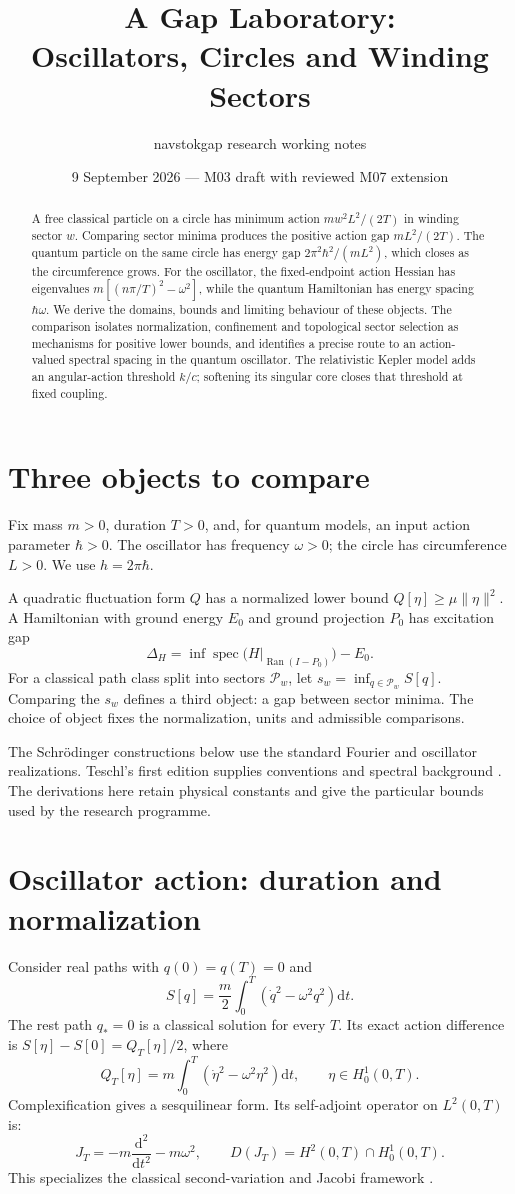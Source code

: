 \documentclass[11pt,a4paper]{article}
\title{A Gap Laboratory:\\Oscillators, Circles and Winding Sectors}
\author{navstokgap research working notes}
\date{9 September 2026 --- M03 draft with reviewed M07 extension}
\newcommand{\dd}{\mathrm{d}}
\newcommand{\spec}{\operatorname{spec}}
\begin{document}
\maketitle
\begin{abstract}
A free classical particle on a circle has minimum action $mw^2L^2/(2T)$
in winding sector $w$. Comparing sector minima produces the positive action
gap $mL^2/(2T)$. The quantum particle on the same circle has energy gap
$2\pi^2\hbar^2/(mL^2)$, which closes as the circumference grows.
For the oscillator, the fixed-endpoint action Hessian has eigenvalues
$m[(n\pi/T)^2-\omega^2]$, while the quantum Hamiltonian has energy spacing
$\hbar\omega$. We derive the domains, bounds and limiting behaviour of these
objects. The comparison isolates normalization, confinement and topological
sector selection as mechanisms for positive lower bounds, and identifies a
precise route to an action-valued spectral spacing in the quantum oscillator.
The relativistic Kepler model adds an angular-action threshold $k/c$;
softening its singular core closes that threshold at fixed coupling.
\end{abstract}

\section{Three objects to compare}
Fix mass $m>0$, duration $T>0$, and, for quantum models, an input action
parameter $\hbar>0$. The oscillator has frequency $\omega>0$; the circle has
circumference $L>0$. We use $h=2\pi\hbar$.

A quadratic fluctuation form $Q$ has a normalized lower bound
$Q[\eta]\ge\mu\|\eta\|^2$. A Hamiltonian with ground energy $E_0$ and ground
projection $P_0$ has excitation gap
\[
 \Delta_H=\inf\spec\bigl(H|_{\operatorname{Ran}(I-P_0)}\bigr)-E_0.
\]
For a classical path class split into sectors $\mathcal P_w$, let
$s_w=\inf_{q\in\mathcal P_w}S[q]$. Comparing the $s_w$ defines a third object:
a gap between sector minima. The choice of object fixes the normalization,
units and admissible comparisons.

The Schr\"odinger constructions below use the standard Fourier and oscillator
realizations. Teschl's first edition supplies conventions and spectral background
\cite[\S7.2, \S8.3]{Teschl2009}. The derivations here retain physical constants
and give the particular bounds used by the research programme.

\section{Oscillator action: duration and normalization}
Consider real paths with $q(0)=q(T)=0$ and
\[
 S[q]=\frac m2\int_0^T(\dot q^2-\omega^2q^2)\dd t.
\]
The rest path $q_*=0$ is a classical solution for every $T$. Its exact action
difference is $S[\eta]-S[0]=Q_T[\eta]/2$, where
\[
 Q_T[\eta]=m\int_0^T(\dot\eta^2-\omega^2\eta^2)\dd t,
 \qquad \eta\in H^1_0(0,T).
\]
Complexification gives a sesquilinear form. Its self-adjoint operator on
$L^2(0,T)$ is:
\[
 J_T=-m\frac{\dd^2}{\dd t^2}-m\omega^2,
 \qquad D(J_T)=H^2(0,T)\cap H^1_0(0,T).
\]
This specializes the classical second-variation and Jacobi framework
\cite[\S8.2]{Cristoferi2016CalculusVariations}.
\end{document}

